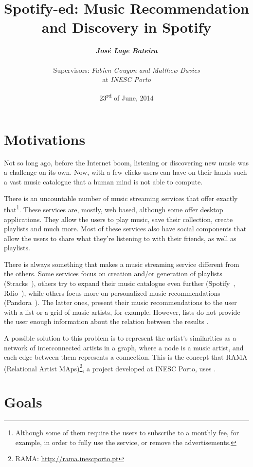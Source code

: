 \documentclass[twocolumn]{article}
\title{
  \huge
  \textbf{
    Spotify-ed: Music Recommendation and Discovery in Spotify
  }
}
\author{
  \large{\emph{\textbf{José Lage Bateira}}} \\ \\
  Supervisors: \emph{Fabien Gouyon and Matthew Davies}  \\
  at \emph{INESC Porto}
}
\date{23\textsuperscript{rd} of June, 2014}
\begin{document}
\maketitle

\thispagestyle{empty}

\section{Motivations}
\label{sec:motivations}

  Not so long ago, before the Internet boom, listening or discovering new music was a challenge on its own.
  Now, with a few clicks users can have on their hands such a vast music catalogue that a human mind is not able to compute.

  There is an uncountable number of music streaming services that offer exactly that\footnote{Although some of them require the users to subscribe to a monthly fee, for example, in order to fully use the service, or remove the advertisements.}.
  These services are, mostly, web based, although some offer desktop applications.
  They allow the users to play music, save their collection, create playlists and much more.
  Most of these services also have social components that allow the users to share what they're listening to with their friends, as well as playlists.

  There is always something that makes a music streaming service different from the others.
  Some services focus on creation and/or generation of playlists (8tracks~\cite{8tracks}), others try to expand their music catalogue even further (Spotify~\cite{spotify}, Rdio~\cite{rdio}), while others focus more on personalized music recommendations (Pandora~\cite{pandora}).
  The latter ones, present their music recommendations to the user with a list or a grid of music artists, for example.
  However, lists do not provide the user enough information about the relation between the results \cite{Lamere2008}.

  A possible solution to this problem is to represent the artist's similarities as a network of interconnected artists in a graph, where a node is a music artist, and each edge between them represents a connection.
  This is the concept that RAMA (Relational Artist MAps)\footnote{RAMA: \url{http://rama.inescporto.pt}}, a project developed at INESC Porto, uses \cite{Costa2008} \cite{Sarmento2009} \cite{Costa2009} \cite{Gouyon2011}.
  

\section{Goals}
\label{sec:goals}
\end{document}

